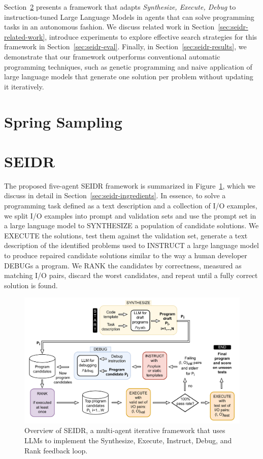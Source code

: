 Section~\ref{sec:seidr-methodology} presents a framework that adapts \emph{Synthesize, Execute, Debug} to instruction-tuned Large Language Models in agents that can solve programming tasks in an autonomous fashion. 
We discuss related work in Section~\ref{sec:seidr-related-work}, introduce experiments to explore effective search 
strategies for this framework in Section~\ref{sec:seidr-eval}. 
Finally, in Section~\ref{sec:seidr-results}, we demonstrate that our framework outperforms conventional automatic programming techniques, such as genetic programming and naive application of large language models that generate one solution per problem without updating it iteratively. 

\section{Spring Sampling}


\section{SEIDR}
\label{sec:seidr-methodology}
The proposed five-agent SEIDR framework is summarized in Figure~\ref{fig:method}, which we discuss in detail in Section~\ref{sec:seidr-ingredients}.
In essence, to solve a programming task defined as a text description and a collection of I/O examples, we split I/O examples into prompt and validation sets and use the prompt set in a large language model to SYNTHESIZE a population of candidate solutions.
We EXECUTE the solutions, test them against the validation set, generate a text description of the identified problems used to INSTRUCT a large language model to produce repaired candidate solutions similar to the way a human developer DEBUGs a program.
We RANK the candidates
by correctness, measured as matching I/O pairs, discard the worst candidates, and repeat until a fully correct solution is found.

\begin{figure}
    \centering
    \includegraphics[width=\linewidth,trim={0mm 0mm 0mm 0mm}]{images/codex-for-psb-seidr-methodology-5.drawio.pdf}
    \caption{Overview of SEIDR, a multi-agent iterative framework that uses LLMs to implement the Synthesize, Execute, Instruct, Debug, and Rank feedback loop.}
    \label{fig:method}
\end{figure}
 

